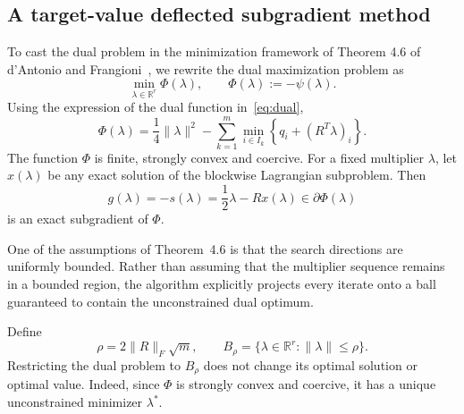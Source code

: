 \documentclass[12pt]{article}
\newcommand{\R}{\mathbb{R}}
\begin{document}
\subsection{A target-value deflected subgradient method}
To cast the dual problem in the minimization framework of Theorem 4.6 of d'Antonio and Frangioni~\cite[p.~382]{dantoniofrangioni}, we rewrite the dual maximization problem as
\begin{equation}
\min_{\lambda\in\R^r}\Phi(\lambda),
\qquad
\Phi(\lambda):=-\psi(\lambda).
\label{eq:phi-problem}
\end{equation}
Using the expression of the dual function in~\eqref{eq:dual},
\begin{equation}
\Phi(\lambda)
=\frac14\|\lambda\|^2
-\sum_{k=1}^m\min_{i\in I_k}
\left\{q_i+(R^T\lambda)_i\right\}.
\label{eq:phi}
\end{equation}
The function $\Phi$ is finite, strongly convex and coercive.  For a fixed multiplier $\lambda$, let $x(\lambda)$ be any exact solution of the blockwise Lagrangian subproblem. Then
\begin{equation}
g(\lambda)
=-s(\lambda)
=\frac12\lambda-Rx(\lambda)
\in\partial\Phi(\lambda)
\label{eq:phi-subgradient}
\end{equation}
is an exact subgradient of $\Phi$.

One of the assumptions of Theorem~4.6 is that the search directions are uniformly bounded. Rather than assuming that the multiplier sequence remains in a bounded region, the algorithm explicitly projects every iterate onto a ball guaranteed to contain the unconstrained dual optimum.

Define
\begin{equation}
\rho=2\|R\|_F\sqrt m,
\qquad
B_\rho=\{\lambda\in\R^r:\|\lambda\|\le\rho\}.
\label{eq:dual-ball}
\end{equation}
Restricting the dual problem to $B_\rho$ does not change its optimal solution or optimal value. Indeed, since $\Phi$ is strongly convex and coercive, it has a unique unconstrained minimizer $\lambda^*$.
\end{document}
